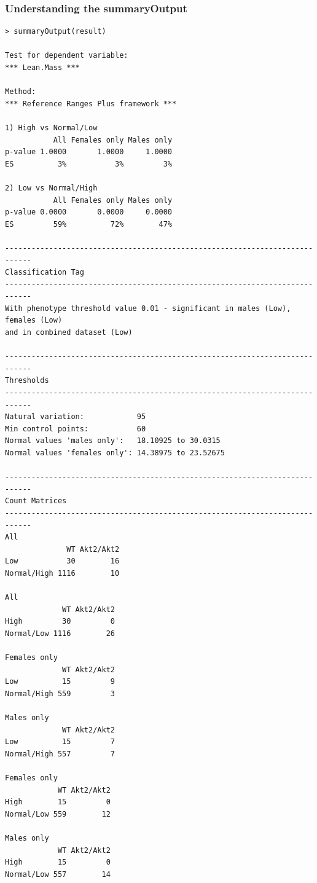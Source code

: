 \documentclass[12pt,a4paper]{article}
\begin{document}
\subsubsection{Understanding the summaryOutput}

\begingroup
    \fontsize{8pt}{12pt}\selectfont
\begin{verbatim}
> summaryOutput(result)

Test for dependent variable:
*** Lean.Mass ***

Method:
*** Reference Ranges Plus framework ***

1) High vs Normal/Low
           All Females only Males only
p-value 1.0000       1.0000     1.0000
ES          3%           3%         3%

2) Low vs Normal/High
           All Females only Males only
p-value 0.0000       0.0000     0.0000
ES         59%          72%        47%

----------------------------------------------------------------------------
Classification Tag
----------------------------------------------------------------------------
With phenotype threshold value 0.01 - significant in males (Low), females (Low) 
and in combined dataset (Low)

----------------------------------------------------------------------------
Thresholds
----------------------------------------------------------------------------
Natural variation:            95                  
Min control points:           60                  
Normal values 'males only':   18.10925 to 30.0315 
Normal values 'females only': 14.38975 to 23.52675

----------------------------------------------------------------------------
Count Matrices
----------------------------------------------------------------------------
All
              WT Akt2/Akt2
Low           30        16
Normal/High 1116        10

All
             WT Akt2/Akt2
High         30         0
Normal/Low 1116        26

Females only
             WT Akt2/Akt2
Low          15         9
Normal/High 559         3

Males only
             WT Akt2/Akt2
Low          15         7
Normal/High 557         7

Females only
            WT Akt2/Akt2
High        15         0
Normal/Low 559        12

Males only
            WT Akt2/Akt2
High        15         0
Normal/Low 557        14
\end{verbatim}
\endgroup 
\end{document}
